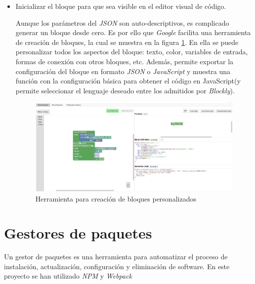 \begin{itemize}
    \item Inicializar el bloque para que sea visible en el editor visual de código. 
    
    Aunque los parámetros del \textit{JSON} son auto-descriptivos, es complicado generar un bloque desde cero. Es por ello que \textit{Google} facilita  una herramienta de creación de bloques, la cual se muestra en la figura \ref{fig:googleTool}. 
    En ella se puede personalizar todos los aspectos del bloque: texto, color, variables de entrada, formas de conexión con otros bloques, etc.
    Además, permite exportar la configuración del bloque en formato \textit{JSON} o \textit{JavaScript} y muestra una función con la configuración básica para obtener el código en JavaScript(y permite seleccionar el lenguaje deseado entre los admitidos por \textit{Blockly}).
    \begin{figure}[H]
    \centering
    \includegraphics[width=1.1\textwidth]{img/GoogleTool.png}
    \caption{Herramienta para creación de bloques personalizados} \label{fig:googleTool}
    \end{figure}
    
\end{itemize}

\section{Gestores de paquetes}
\label{sec:gest}
Un gestor de paquetes es una herramienta para automatizar el proceso de instalación, actualización, configuración y eliminación de software. En este proyecto se han utilizado \textit{NPM} y \textit{Webpack} 
